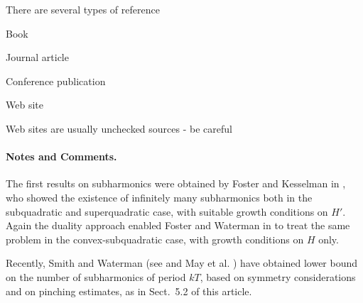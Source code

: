 \documentclass[lnicst,a4paper]{svmultln}
\begin{document}
There are several types of reference

Book

Journal article

Conference publication

Web site

Web sites are usually unchecked sources -
be careful





\paragraph{Notes and Comments.}
The first results on subharmonics were
obtained by Foster and Kesselman in \cite{fos:kes}, who showed the existence of
infinitely many subharmonics both in the subquadratic and superquadratic
case, with suitable growth conditions on $H'$. Again the duality
approach enabled Foster and Waterman in \cite{fos:kes:2} to treat the
same problem in the convex-subquadratic case, with growth conditions on
$H$ only.

Recently, Smith and Waterman (see \cite{smit:wat} and May et al. \cite{mes})
have obtained lower bound on the number of subharmonics of period $kT$,
based on symmetry considerations and on pinching estimates, as in
Sect.~5.2 of this article.




\end{document}
